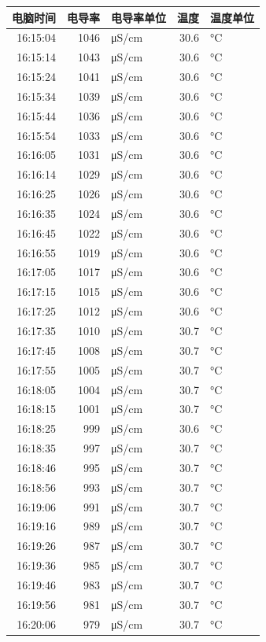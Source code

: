 \documentclass[11pt]{article}
\begin{document}
\begin{enumerate}
\begin{center}
\begin{tabular}{rrlrl}
电脑时间 & 电导率 & 电导率单位 & 温度 & 温度单位\\
\hline
16:15:04 & 1046 & μS/cm & 30.6 & °C\\
16:15:14 & 1043 & μS/cm & 30.6 & °C\\
16:15:24 & 1041 & μS/cm & 30.6 & °C\\
16:15:34 & 1039 & μS/cm & 30.6 & °C\\
16:15:44 & 1036 & μS/cm & 30.6 & °C\\
16:15:54 & 1033 & μS/cm & 30.6 & °C\\
16:16:05 & 1031 & μS/cm & 30.6 & °C\\
16:16:14 & 1029 & μS/cm & 30.6 & °C\\
16:16:25 & 1026 & μS/cm & 30.6 & °C\\
16:16:35 & 1024 & μS/cm & 30.6 & °C\\
16:16:45 & 1022 & μS/cm & 30.6 & °C\\
16:16:55 & 1019 & μS/cm & 30.6 & °C\\
16:17:05 & 1017 & μS/cm & 30.6 & °C\\
16:17:15 & 1015 & μS/cm & 30.6 & °C\\
16:17:25 & 1012 & μS/cm & 30.6 & °C\\
16:17:35 & 1010 & μS/cm & 30.7 & °C\\
16:17:45 & 1008 & μS/cm & 30.7 & °C\\
16:17:55 & 1005 & μS/cm & 30.7 & °C\\
16:18:05 & 1004 & μS/cm & 30.7 & °C\\
16:18:15 & 1001 & μS/cm & 30.7 & °C\\
16:18:25 & 999 & μS/cm & 30.6 & °C\\
16:18:35 & 997 & μS/cm & 30.7 & °C\\
16:18:46 & 995 & μS/cm & 30.7 & °C\\
16:18:56 & 993 & μS/cm & 30.7 & °C\\
16:19:06 & 991 & μS/cm & 30.7 & °C\\
16:19:16 & 989 & μS/cm & 30.7 & °C\\
16:19:26 & 987 & μS/cm & 30.7 & °C\\
16:19:36 & 985 & μS/cm & 30.7 & °C\\
16:19:46 & 983 & μS/cm & 30.7 & °C\\
16:19:56 & 981 & μS/cm & 30.7 & °C\\
16:20:06 & 979 & μS/cm & 30.7 & °C\\

\end{tabular}
\end{center}
\end{enumerate}
\end{document}
